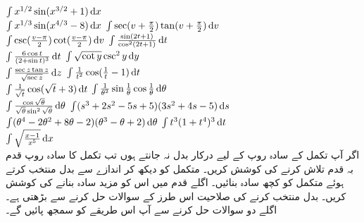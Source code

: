 $\int x^{1/2}\sin(x^{3/2}+1)\dif x$\\
$\int x^{1/3}\sin(x^{4/3}-8)\dif x$
$\int\sec(v+\tfrac{\pi}{2})\tan(v+\tfrac{\pi}{2})\dif v$\\
$\int\csc(\tfrac{v-\pi}{2})\cot(\tfrac{v-\pi}{2})\dif v$
$\int\tfrac{\sin(2t+1)}{\cos^2(2t+1)}\dif t$\\
$\int\tfrac{6\cos t}{(2+\sin t)^3}\dif t$
$\int\sqrt{\cot y}\csc^2 y\dif y$\\
$\int\tfrac{\sec z\tan z}{\sqrt{\sec z}}\dif z$
$\int \tfrac{1}{t^2}\cos(\tfrac{1}{t}-1)\dif t$\\
$\int\tfrac{1}{\sqrt{t}}\cos(\sqrt{t}+3)\dif t$
$\int\tfrac{1}{\theta^2}\sin\tfrac{1}{\theta}\cos\tfrac{1}{\theta}\dif\theta$\\
$\int\tfrac{\cos\sqrt{\theta}}{\sqrt{\theta}\sin^2\sqrt{\theta}}\dif\theta$
$\int(s^3+2s^2-5s+5)(3s^2+4s-5)\dif s$\\
$\int(\theta^4-2\theta^2+8\theta-2)(\theta^3-\theta+2)\dif\theta$
$\int t^3(1+t^4)^3\dif t$\\
$\int\sqrt{\tfrac{x-1}{x^5}}\dif x$
\\
اگر آپ تکمل کے سادہ روپ کے لیے درکار بدل نہ جانتے ہوں تب تکمل کا سادہ روپ قدم بہ قدم تلاش کرنے کی کوشش کریں۔ متکمل کو دیکھ کر اندازے سے بدل منتخب کرتے ہوئے متکمل کو کچھ سادہ بنائیں۔ اگلے قدم میں اس کو مزید سادہ بنانے کی کوشش کریں۔ بدل منتخب کرنے کی صلاحیت اس طرز کے سوالات حل کرنے سے بڑھتی ہے۔ اگلے دو سوالات حل کرنے سے آپ اس طریقے کو سمجھ پائیں گے۔ 

